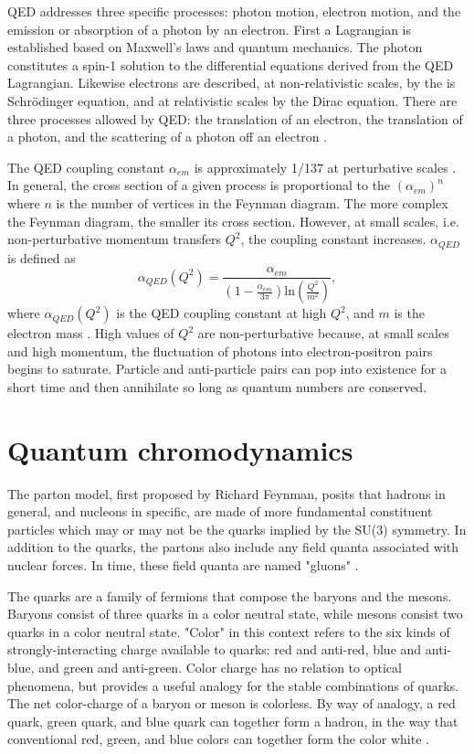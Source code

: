 QED addresses three specific processes: photon motion, electron motion, and the emission or absorption of a photon by an electron. First a Lagrangian is established based on Maxwell's laws and quantum mechanics. The photon constitutes a spin-1 solution to the differential equations derived from the QED Lagrangian. Likewise electrons are described, at non-relativistic scales, by the is Schr\"{o}dinger equation, and at relativistic scales by the Dirac equation. There are three processes allowed by QED: the translation of an electron, the translation of a photon, and the scattering of a photon off an electron \cite{Griffiths:2008zz}. 

The QED coupling constant $\alpha_{em}$ is approximately 1/137 at perturbative scales \cite{Bouchendira:2010es}. In general, the cross section of a given process is proportional to the $(\alpha_{em})^n$ where $n$ is the number of vertices in the Feynman diagram. The more complex the Feynman diagram, the smaller its cross section. However, at small scales, i.e. non-perturbative momentum transfers $Q^2$, the coupling constant increases. $\alpha_{QED}$ is defined as
\begin{equation}
\alpha_{QED}(Q^2) = \frac{ \alpha_{em}}{(1 - \frac{\alpha_{em}}{3\pi})\mathrm{ln}(\frac{Q^2}{m^2}) },
\end{equation}
where $\alpha_{QED}(Q^2)$ is the QED coupling constant at high $Q^2$, and $m$ is the electron mass \cite{Abbiendi:2005rx}. High values of $Q^2$ are non-perturbative because, at small scales and high momentum, the fluctuation of photons into electron-positron pairs begins to saturate. Particle and anti-particle pairs can pop into existence for a short time and then annihilate so long as quantum numbers are conserved. 

\section{Quantum chromodynamics}

The parton model, first proposed by Richard Feynman, posits that hadrons in general, and nucleons in specific, are made of more fundamental constituent particles which may or may not be the quarks implied by the SU(3) symmetry. In addition to the quarks, the partons also include any field quanta associated with nuclear forces. In time, these field quanta are named "gluons" \cite{GellMann:1964nj}.

The quarks are a family of fermions that compose the baryons and the mesons. Baryons consist of three quarks in a color neutral state, while mesons consist two quarks in a color neutral state. "Color" in this context refers to the six kinds of strongly-interacting charge available to quarks: red and anti-red, blue and anti-blue, and green and anti-green. Color charge has no relation to optical phenomena, but provides a useful analogy for the stable combinations of quarks. The net color-charge of a baryon or meson is colorless. By way of analogy, a red quark, green quark, and blue quark can together form a hadron, in the way that conventional red, green, and blue colors can together form the color white \cite{Brock:1993sz}. 

